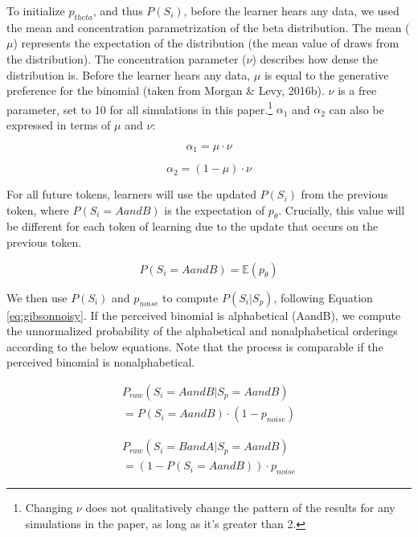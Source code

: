 \documentclass[10pt, letterpaper]{article}
\begin{document}
To initialize \(p_{theta}\), and thus \(P(S_i)\), before the learner
hears any data, we used the mean and concentration parametrization of
the beta distribution. The mean (\(\mu\)) represents the expectation of
the distribution (the mean value of draws from the distribution). The
concentration parameter (\(\nu\)) describes how dense the distribution
is. Before the learner hears any data, \(\mu\) is equal to the
generative preference for the binomial (taken from Morgan \& Levy,
2016b). \(\nu\) is a free parameter, set to 10 for all simulations in
this paper.\footnote{Changing \(\nu\) does not qualitatively change the
  pattern of the results for any simulations in the paper, as long as
  it's greater than 2.} \(\alpha_1\) and \(\alpha_2\) can also be
expressed in terms of \(\mu\) and \(\nu\):

\begin{equation}
\label{eq:alpha1}
\alpha_1 = \mu \cdot \nu
\end{equation}

\begin{equation}
\label{eq:alpha2}
\alpha_2 = (1-\mu) \cdot \nu
\end{equation}

For all future tokens, learners will use the updated \(P(S_i)\) from the
previous token, where \(P(S_i = AandB)\) is the expectation of
\(p_\theta\). Crucially, this value will be different for each token of
learning due to the update that occurs on the previous token.

\begin{equation}
\label{eq:expectationptheta}
P(S_i = AandB) = \mathbb{E}(p_\theta)
\end{equation}

We then use \(P(S_i)\) and \(p_{noise}\) to compute \(P(S_i|S_p)\),
following Equation \ref{eq:gibsonnoisy}. If the perceived binomial is
alphabetical (AandB), we compute the unnormalized probability of the
alphabetical and nonalphabetical orderings according to the below
equations. Note that the process is comparable if the perceived binomial
is nonalphabetical.

\begin{multline}
\label{eq:praw}
P_{raw}(S_i = AandB|S_p = AandB) \\ = P(S_i = AandB) \cdot (1 -  p_{noise})
\end{multline}

\begin{multline}
\label{eq:prawtwo}
P_{raw}(S_i = BandA|S_p = AandB) \\ = (1 - P(S_i = AandB)) \cdot p_{noise}
\end{multline}
\end{document}
